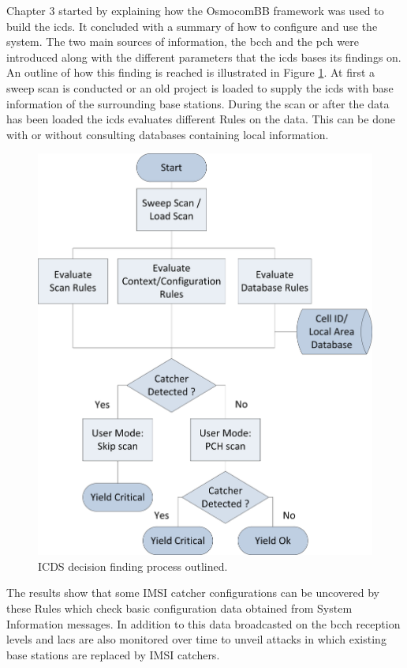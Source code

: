Chapter 3 started by explaining how the OsmocomBB framework was used to build the \gls{icds}.
It concluded with a summary of how to configure and use the system.
The two main sources of information, the \gls{bcch} and the \gls{pch} were introduced along with the different parameters that the \gls{icds} bases its findings on.
An outline of how this finding is reached is illustrated in Figure \ref{fig:decision_process}.
At first a sweep scan is conducted or an old project is loaded to supply the \gls{icds} with base information of the surrounding base stations.
During the scan or after the data has been loaded the \gls{icds} evaluates different Rules on the data.
This can be done with or without consulting databases containing local information.
\begin{figure}
\centering
\includegraphics{../Images/flowchart}
\caption{ICDS decision finding process outlined.}
\label{fig:decision_process}
\end{figure}
The results show that some IMSI catcher configurations can be uncovered by these Rules which check basic configuration data obtained from System Information messages.
In addition to this data broadcasted on the \gls{bcch} reception levels and \glspl{lac} are also monitored over time to unveil attacks in which existing base stations are replaced by IMSI catchers.
